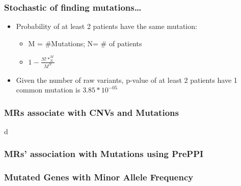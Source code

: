 \documentclass{beamer}
\begin{document}
\begin{frame}
\frametitle{Stochastic of finding mutations\dots}
\begin{itemize}
	\item Probability of at least 2 patients have the same mutation: 
			\begin{itemize}
				\item  M = \#Mutations; N= \# of patients
				\item  $1 - \frac{N! * ^M_N}{M^N}$
			\end{itemize}
	\item Given the number of raw variants, p-value of at 
	least 2 patients have 1 common mutation is $3.85 * 10^{-05}$
\end{itemize}
\end{frame}
\begin{frame}
\frametitle{MRs associate with CNVs and Mutations}
d\end{frame}
\begin{frame}[fragile] %
\frametitle{MRs' association with Mutations using PrePPI }

\end{frame}
\begin{frame}[fragile] %
\frametitle{Mutated Genes with Minor Allele Frequency  }
\end{frame}
\end{document}
